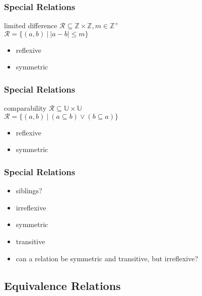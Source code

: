 \documentclass[dvipsnames]{beamer}
\begin{document}
\begin{frame}
  \frametitle{Special Relations}

  \begin{block}{limited difference}
    $\mathcal{R} \subseteq \mathbb{Z} \times \mathbb{Z}, m \in \mathbb{Z}^+$\\
    $\mathcal{R} = \{(a,b)~|~|a-b| \leq m\}$
  \end{block}

  \medskip
  \begin{itemize}
    \item reflexive
    \item symmetric
  \end{itemize}
\end{frame}

\begin{frame}
  \frametitle{Special Relations}

  \begin{block}{comparability}
    $\mathcal{R} \subseteq \mathbb{U} \times \mathbb{U}$\\
    $\mathcal{R} = \{(a,b)~|~(a \subseteq b) \vee (b \subseteq a)\}$
  \end{block}

  \medskip
  \begin{itemize}
    \item reflexive
    \item symmetric
  \end{itemize}
\end{frame}

\begin{frame}
  \frametitle{Special Relations}

  \begin{itemize}
    \item siblings?

    \medskip
    \item irreflexive
    \item symmetric
    \item transitive
  \end{itemize}

  \pause
  \medskip
  \begin{itemize}
    \item can a relation be symmetric and transitive, but irreflexive?
  \end{itemize}
\end{frame}

\subsection{Equivalence Relations}
\end{document}
